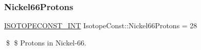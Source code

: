 \subsubsection{\texorpdfstring{Nickel66\+Protons}{Nickel66Protons}}
{\footnotesize\ttfamily \mbox{\hyperlink{group___isotope_const-_macros_ga5f18360b3e99483a35c32d789e62621c}{I\+S\+O\+T\+O\+P\+E\+C\+O\+N\+S\+T\+\_\+\+I\+NT}} Isotope\+Const\+::\+Nickel66\+Protons = 28}

\$ \$ Protons in Nickel-\/66. 